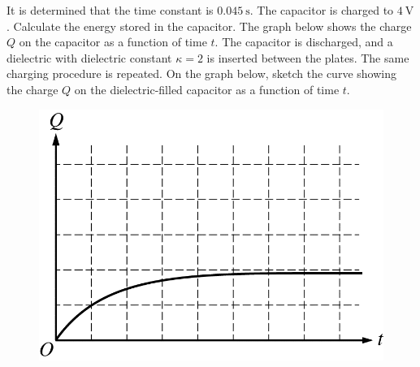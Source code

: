 \begin{parts}
\begin{subparts}
\subpart It is determined that the time constant is $0.045 \mathrm{~s}$. The capacitor is charged to $4 \mathrm{~V}$. Calculate the energy stored in the capacitor.
\subpart The graph below shows the charge $Q$ on the capacitor as a function of time $t$. The capacitor is discharged, and a dielectric with dielectric constant $\kappa=2$ is inserted between the plates. The same charging procedure is repeated. On the graph below, sketch the curve showing the charge $Q$ on the dielectric-filled capacitor as a function of time $t$.

\begin{figure}[H]
\centering
\includegraphics[scale=0.3]{images/img-022-049.png}
\end{figure}

\end{subparts}

\end{parts}
